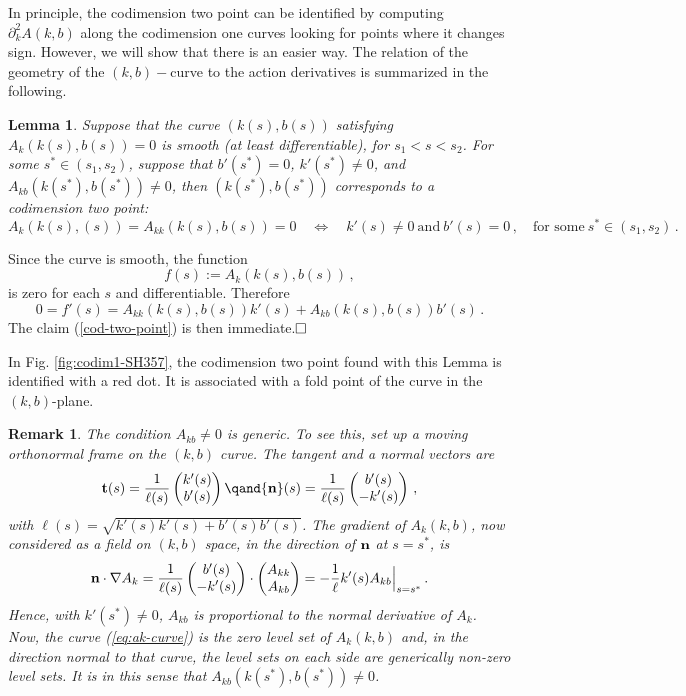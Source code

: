 \documentclass[10pt]{article}
\newtheorem{lem}[thm]{Lemma}
\newtheorem{rmk}[thm]{Remark}
\begin{document}
In principle, the codimension two point can be identified by computing $\partial_{k}^2A(k,b)$ along the codimension one curves looking for points where it changes sign.  However, we will show that there is an easier way. The relation of
the geometry of the $(k,b)-$curve to the action derivatives is summarized in
the following. 

\begin{lem}\label{lemma5.1} {\it Suppose that the curve $(k(s),b(s))$ satisfying
  $A_k(k(s),b(s))=0$ is smooth (at least differentiable), for $s_1<s<s_2$. For
  some $s^*\in(s_1,s_2)$, suppose that $b'(s^*)=0$, $k'(s^*)\neq0$, and
  $A_{kb}(k(s^*),b(s^*))\neq0$, then $(k(s^*),b(s^*))$ corresponds to a
  codimension two point:}
%
\begin{equation}\label{cod-two-point}
  A_k(k(s),(s)) = A_{kk}(k(s),b(s))=0\quad \Leftrightarrow\quad
  k'(s) \neq0\ \mbox{and}\ b'(s)=0\,,\quad\mbox{for some}\ s^*\in(s_1,s_2)\,.
\end{equation}
\end{lem}

 Since the curve is smooth, the function
\[
f(s) := A_k(k(s),b(s)) \,,
\]
is zero for each $s$ and differentiable.  Therefore
\[
0 = f'(s) = A_{kk}(k(s),b(s))k'(s) + A_{kb}(k(s),b(s))b'(s)\,.
\]
The claim (\ref{cod-two-point}) is then immediate.$\hfill\square$
\vspace{.15cm}

In Fig. \ref{fig:codim1-SH357}, the codimension two point found with this Lemma is identified with a red dot. It is associated with a fold point of the curve in the $(k,b)$-plane. 

\begin{rmk} The condition $A_{kb}\neq0$ is generic.  To see this, set
up a moving orthonormal frame on the $(k,b)$ curve.  The tangent and a normal
vectors are
\[
{\bf t}(s) = \frac{1}{\ell(s)}\begin{pmatrix} k'(s)\\ b'(s)\end{pmatrix}
\qand {\bf n}(s) = \frac{1}{\ell(s)}\begin{pmatrix} b'(s)\\ -k'(s)\end{pmatrix}\,,
\]
with $\ell(s) = \sqrt{k'(s)k'(s)+b'(s)b'(s)}$.  The gradient of $A_k(k,b)$, now
considered as a field on $(k,b)$ space, in the direction of ${\bf n}$ at
$s=s^*$, is
\[
  {\bf n}\cdot\nabla A_k = \frac{1}{\ell(s)}\begin{pmatrix} b'(s)\\ -k'(s)\end{pmatrix}\cdot\begin{pmatrix} A_{kk}\\ A_{kb}\end{pmatrix}  =
  -\frac{1}{\ell} k'(s) A_{kb}\Big|_{s=s^*}\,.
  \]
  Hence, with $k'(s^*)\neq0$, $A_{kb}$ is proportional to the normal derivative
  of $A_k$.  Now, the curve (\ref{eq:ak-curve}) is the zero level set of $A_k(k,b)$
  and, in the direction normal to that curve, the level sets on each side are
  generically non-zero level sets. It is in this sense that
  $A_{kb}(k(s^*),b(s^*))\neq0$.
  \end{rmk}
\end{document}

